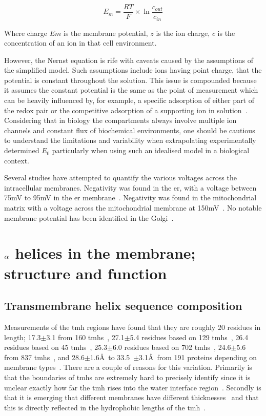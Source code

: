 \begin{equation}
{E}_{m}=\frac{RT}{F}\times \ln { \frac{{c}_{out}}{{c}_{in}} }
\end{equation}

Where charge $Em$ is the membrane potential, $z$ is the ion charge, $c$ is the concentration of an ion in that cell environment.

However, the Nernst equation is rife with caveats caused by the assumptions of the simplified model.
Such assumptions include ions having point charge, that the potential is constant throughout the solution.
This issue is compounded because it assumes the constant potential is the same as the point of measurement which can be heavily influenced by, for example, a specific adsorption of either part of the redox pair or the competitive adsorption of a supporting ion in solution~\cite{Feiner1994}.
Considering that in biology the compartments always  involve multiple ion channels and constant flux of biochemical environments, one should be cautious to understand the limitations and variability when extrapolating experimentally determined ${E}_{0}$ particularly when using such an idealised model in a biological context.

Several studies have attempted to quantify the various voltages across the intracellular membranes.
Negativity was found in the \gls{er}, with a voltage between 75mV to 95mV in the \gls{er} membrane~\cite{Qin2011, Worley1994}.
Negativity was found in the mitochondrial matrix with a  voltage across the mitochondrial membrane at 150mV~\cite{Perry2011}.
No notable membrane potential has been identified in the Golgi~\cite{Schapiro2000, Llopis1998}.

\section{$\protect\alpha$ helices in the membrane; structure and function}

\subsection{Transmembrane helix sequence composition}

Measurements of the \gls{tmh} regions have found that they are roughly 20 residues in length; 17.3$\pm$3.1 from 160 \gls{tmh}s~\cite{Hildebrand2004}, 27.1$\pm$5.4 residues based on 129 \gls{tmh}s~\cite{Ulmschneider2001}, 26.4 residues based on 45 \gls{tmh}s~\cite{Bowie1997}, 25.3$\pm$6.0 residues based on 702 \gls{tmh}s~\cite{Cuthbertson2005a}, 24.6$\pm$5.6 from 837 \gls{tmh}s~\cite{Baeza-Delgado2013}, and 28.6$\pm$1.6\AA~to 33.5~$\pm$3.1\AA~from 191 proteins depending on membrane types~\cite{Pogozheva2013}.
There are a couple of reasons for this variation.
Primarily is that the boundaries of \gls{tmh}s are extremely hard to precisely identify since it is unclear exactly how far the \gls{tmh} rises into the water interface region~\cite{VonHeijne2006}.
Secondly is that it is emerging that different membranes have different thicknesses~\cite{VanMeer2008} and that this is directly reflected in the hydrophobic lengths of the \gls{tmh}~\cite{Sharpe2010, Pogozheva2013}.

